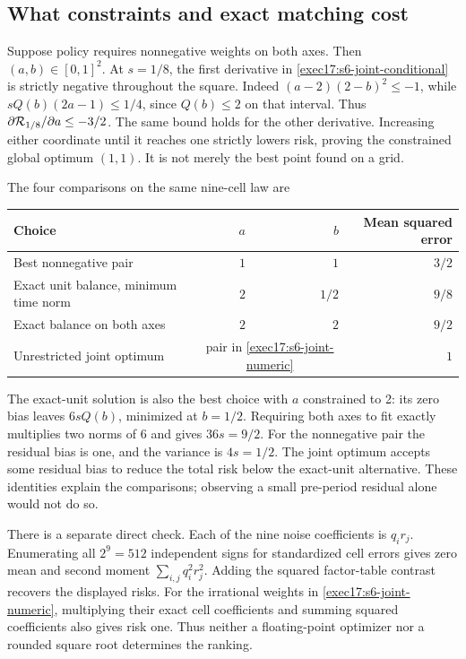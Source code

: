 \subsection{What constraints and exact matching cost}

Suppose policy requires nonnegative weights on both axes. Then
$(a,b)\in[0,1]^2$. At $s=1/8$, the first derivative in
\eqref{exec17:s6-joint-conditional} is strictly negative throughout the
square. Indeed $(a-2)(2-b)^2\leq-1$, while
$sQ(b)(2a-1)\leq1/4$, since $Q(b)\leq2$ on that interval. Thus
$\partial{\cal R}_{1/8}/\partial a\leq-3/2$. The same bound holds for
the other derivative. Increasing either coordinate until it reaches one
strictly lowers risk, proving the constrained global optimum $(1,1)$.
It is not merely the best point found on a grid.

The four comparisons on the same nine-cell law are
\begin{center}
\begin{tabular}{lrrr}
\toprule
Choice & $a$ & $b$ & Mean squared error\\
\midrule
Best nonnegative pair & $1$ & $1$ & $3/2$\\
Exact unit balance, minimum time norm & $2$ & $1/2$ & $9/8$\\
Exact balance on both axes & $2$ & $2$ & $9/2$\\
Unrestricted joint optimum & \multicolumn{2}{c}{pair in \eqref{exec17:s6-joint-numeric}} & $1$\\
\bottomrule
\end{tabular}
\end{center}
The exact-unit solution is also the best choice with $a$ constrained to 2:
its zero bias leaves $6sQ(b)$, minimized at $b=1/2$. Requiring both axes
to fit exactly multiplies two norms of 6 and gives $36s=9/2$. For the
nonnegative pair the residual bias is one, and the variance is $4s=1/2$.
The joint optimum accepts some residual bias to reduce the total risk below
the exact-unit alternative. These identities explain the comparisons;
observing a small pre-period residual alone would not do so.

There is a separate direct check. Each of the nine noise coefficients is
$q_i r_j$. Enumerating all $2^9=512$ independent signs for standardized
cell errors gives zero mean and second moment
$\sum_{i,j}q_i^2r_j^2$. Adding the squared factor-table contrast recovers
the displayed risks. For the irrational weights in
\eqref{exec17:s6-joint-numeric}, multiplying their exact cell coefficients
and summing squared coefficients also gives risk one. Thus neither a
floating-point optimizer nor a rounded square root determines the ranking.
\citep{exec17_s6_extension}

